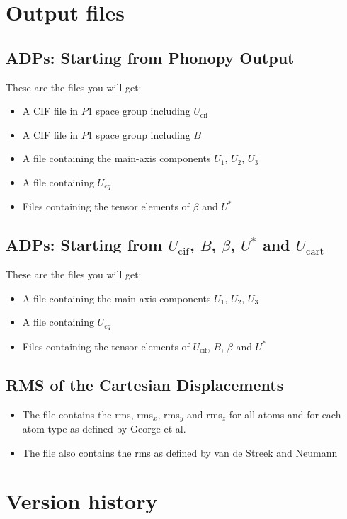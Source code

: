 \documentclass[12pt,a4paper]{article}
\begin{document}
 \section{Output files}
 \subsection{ADPs: Starting from Phonopy Output}
 These are the files you will get:
 \begin{itemize}
  \item A CIF file in $P1$ space group including $U_{\mathrm{cif}}$
  \item A CIF file in $P1$ space group including $B$
  \item A file containing the main-axis components $U_1$, $U_2$, $U_3$
  \item A file containing $U_{eq}$
  \item Files containing the tensor elements of $\beta$ and $U^*$
  
 \end{itemize}

 
 
 \subsection{ADPs: Starting from $U_{\mathrm{cif}}$, $B$, $\beta$, $U^*$ and $U_{\mathrm{cart}}$}
 These are the files you will get:
\begin{itemize}
 \item A file containing the main-axis components $U_1$, $U_2$, $U_3$
  \item A file containing $U_{eq}$
  \item Files containing the tensor elements of $U_{\mathrm{cif}}$, $B$, $\beta$ and $U^*$
  \end{itemize}
 \subsection{RMS of the Cartesian Displacements}
  \begin{itemize}
 \item The file contains the rms, rms$_x$, rms$_y$ and rms$_z$ for all atoms and for each atom type as defined by George et al. 
 \item The file also contains the rms as defined by van de Streek and Neumann
  \end{itemize}
 \newpage
 
 \section{Version history}
 
\end{document}
